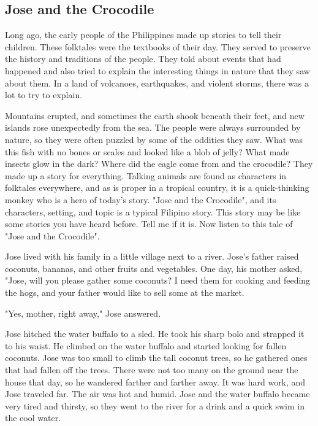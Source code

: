 \subsection{Jose and the Crocodile}

Long ago, the early people of the Philippines made up stories to tell their children. These folktales were the textbooks of their day. They served to preserve the history and traditions of the people. They told about events that had happened and also tried to explain the interesting things in nature that they saw about them. In a land of volcanoes, earthquakes, and violent storms, there was a lot to try to explain.

Mountains erupted, and sometimes the earth shook beneath their feet, and new islands rose unexpectedly from the sea. The people were always surrounded by nature, so they were often puzzled by some of the oddities they saw. What was this fish with no bones or scales and looked like a blob of jelly? What made insects glow in the dark? Where did the eagle come from and the crocodile? They made up a story for everything. Talking animals are found as characters in folktales everywhere, and as is proper in a tropical country, it is a quick-thinking monkey who is a hero of today's story. "Jose and the Crocodile", and its characters, setting, and topic is a typical Filipino story. This story may be like some stories you have heard before. Tell me if it is. Now listen to this tale of "Jose and the Crocodile".

Jose lived with his family in a little village next to a river. Jose's father raised coconuts, bananas, and other fruits and vegetables. One day, his mother asked, "Jose, will you please gather some coconuts? I need them for cooking and feeding the hogs, and your father would like to sell some at the market.

"Yes, mother, right away," Jose answered.

Jose hitched the water buffalo to a sled. He took his sharp bolo and strapped it to his waist. He climbed on the water buffalo and started looking for fallen coconuts. Jose was too small to climb the tall coconut trees, so he gathered ones that had fallen off the trees. There were not too many on the ground near the house that day, so he wandered farther and farther away. It was hard work, and Jose traveled far. The air was hot and humid. Jose and the water buffalo became very tired and thirsty, so they went to the river for a drink and a quick swim in the cool water.

